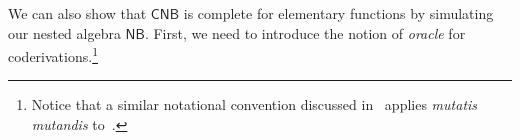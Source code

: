 \documentclass[manuscript,screen]{acmart}
\theoremstyle{definition}
\theoremstyle{remark}
\newtheorem{rem}[thm]{Remark}
\newcommand{\n}{N}
\newcommand{\sq}{\Box}
\newcommand{\sqn}{{\sq\n}}
\newcommand{\sn}{\sqn}
\renewcommand{\succ}[1]{\mathsf{s}_{#1}}
\newcommand{\pred}{\mathsf{p}}
\newcommand{\cnd}{\mathsf{cond}}
\newcommand{\bc}{\mathsf{B}}
\newcommand{\nested}{\mathsf{N}}
\newcommand{\nbc}{\nested\bc}
\newcommand{\seqar}{\Rightarrow}
\newcommand{\der}{\mathcal{D}}
\newcommand{\pder}[1]{\der_{#1}}
\newcommand{\cut}{\mathsf{cut}}
\newcommand{\cyclic}{\mathsf{C}}
\newcommand{\cbc}{\cyclic\bc}
\newcommand{\ncbc}{\cyclic\nested\bc}
\begin{document}



We can also show that $\ncbc$ is complete for elementary functions by  simulating  our nested algebra $\nbc$. 
First, we need to introduce the notion of \emph{oracle} for coderivations.\footnote{Notice that a similar notational convention discussed in~ applies \emph{mutatis mutandis} to~.}
\end{document}

